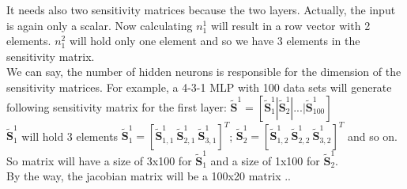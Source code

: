It needs also two sensitivity matrices because the two layers. Actually, the input is again only a scalar. 
Now calculating $n_1^1$ will result in a row vector with 2 elements. $n_1^2$ will hold only one element and so we have 3 elements in the sensitivity matrix.\\

We can say, the number of hidden neurons is responsible for the dimension of the sensitivity matrices.
For example, a 4-3-1 MLP with 100 data sets will generate following sensitivity matrix for the first layer:
$\tilde{\textbf{S}}^1 = [\tilde{\textbf{S}}^1_1 | \tilde{\textbf{S}}^1_2 | ... | \tilde{\textbf{S}}^1_{100}]$\\
\noindent $\tilde{\textbf{S}}^1_1$ will hold 3 elements  $\tilde{\textbf{S}}^1_1 = [\tilde{\textbf{S}}^1_{1,1} ~ \tilde{\textbf{S}}^1_{2,1} ~ \tilde{\textbf{S}}^1_{3,1}]^T$;
$\tilde{\textbf{S}}^1_2 = [\tilde{\textbf{S}}^1_{1,2} ~ \tilde{\textbf{S}}^1_{2,2} ~ \tilde{\textbf{S}}^1_{3,2}]^T$ and so on. So matrix will have a size of 3x100 for $\tilde{\textbf{S}}^1_{1}$
and a size of 1x100 for $\tilde{\textbf{S}}^1_{2}$.\\

By the way, the jacobian matrix will be a 100x20 matrix ..



